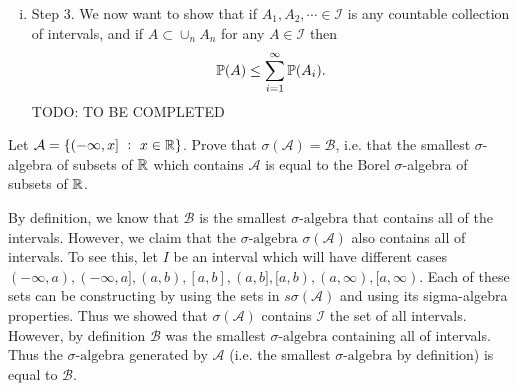 \begin{solution}
\begin{enumerate}[(i)]
		\item Step 3. We now want to show that if $ A_1,A_2,\cdots \in \mathcal{I} $ is any countable collection of intervals, and if $ A \subset \cup_n A_n $ for any $ A \in \mathcal{I} $ then 
		\[ \mathbb{P}(A) \leq \sum_{i=1}^\infty\mathbb{P}(A_i).  \]
		{\color{red} \noindent TODO: TO BE COMPLETED}
	\end{enumerate}
	
\end{solution}


\begin{problem}
	Let $ \mathcal{A} = \set{(-\infty,x]\ :\ x\in \R} $. Prove that $ \sigma(\mathcal{A}) = \mathcal{B} $, i.e. that the smallest $ \sigma $-algebra of subsets of $ \mathbb{R} $ which contains $ \mathcal{A} $ is equal to the Borel $ \sigma $-algebra of subsets of $ \mathbb{R} $.
\end{problem}
\begin{solution}
	By definition, we know that $ \mathcal{B} $ is the smallest $ \sigma\text{-algebra} $ that contains all of the intervals. However, we claim that the $ \sigma\text{-algebra} $ $ \sigma(\mathcal{A}) $ also contains all of intervals. To see this, let $ I $ be an interval which will have different cases $(-\infty,a),(-\infty,a],(a,b),[a,b],(a,b],[a,b),(a,\infty),[a,\infty) $. Each of these sets can be constructing by using the sets in $ s \sigma(\mathcal{A}) $ and using its sigma-algebra properties. Thus we showed that $ \sigma(\mathcal{A}) $ contains $ \mathcal{I} $ the set of all intervals. However, by definition $ \mathcal{B} $ was the smallest $ \sigma\text{-algebra} $ containing all of intervals. Thus the $ \sigma\text{-algebra} $ generated by $ \mathcal{A} $ (i.e. the smallest $ \sigma\text{-algebra} $ by definition) is equal to $ \mathcal{B} $. 
\end{solution}

